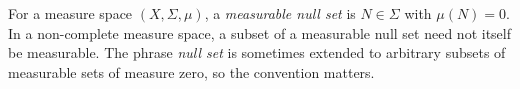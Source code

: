
For a measure space $(X,\Sigma,\mu)$, a \emph{measurable null set} is $N\in\Sigma$ with $\mu(N)=0$. In a non-complete measure space, a subset of a measurable null set need not itself be measurable. The phrase \emph{null set} is sometimes extended to arbitrary subsets of measurable sets of measure zero, so the convention matters.
